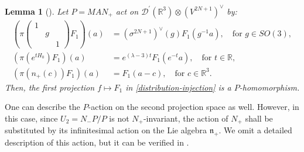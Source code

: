\documentclass[12pt, pdflatex, a4paper]{article}
\theoremstyle{plain}
\newtheorem{lemma}[thm]{Lemma}
\theoremstyle{definition}
\def\Dist{\mathcal{D}^\prime}
\def\n{\mathfrak{n}}
\def\R{{\mathbb R}}
\begin{document}
\begin{lemma}[{\cite[Lem. 5.12]{KS18}}]\label{lemma_P_action_dist} Let $P = MAN_+$ act on $\Dist(\R^3) \otimes (V^{2N+1})^\vee$ by:
\begin{align*}
\left(\pi
\begin{pmatrix}
1 & &\\
& g &\\
& & 1
\end{pmatrix}
F_1
\right)(a) &= (\sigma^{2N+1})^\vee(g)F_1(g^{-1}a), \quad \text{for } g \in SO(3),\\
\left(\pi(e^{tH_0})F_1\right)(a) &= e^{(\lambda-3)t}F_1(e^{-t}a), \quad \text{for } t \in \R,\\
\left(\pi(n_+(c))F_1\right)(a) & = F_1(a-c), \quad \text{for } c \in \R^3.
\end{align*}
Then, the first projection $f \mapsto F_1$ in \eqref{distribution-injection} is a $P$-homomorphism.
\end{lemma}

One can describe the $P$-action on the second projection space as well. However, in this case, since $U_2 = N_-P/P$ is not $N_+$-invariant, the action of $N_+$ shall be substituted by its infinitesimal action on the Lie algebra $\n_+$. We omit a detailed description of this action, but it can be verified in \cite[Lem. 5.13]{KS18}.
\end{document}
